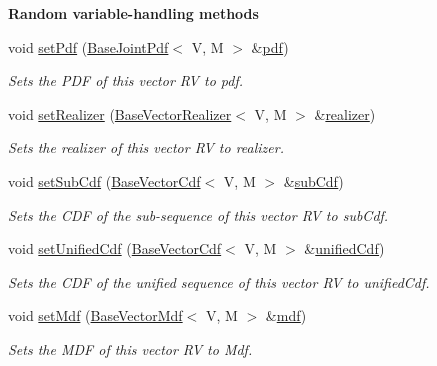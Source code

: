 \begin{Indent}{\bf Random variable-\/handling methods}\par
\begin{DoxyCompactItemize}
\item 
void \hyperlink{class_q_u_e_s_o_1_1_generic_vector_r_v_a1645a2db9e84b44df65faefda9921277}{set\-Pdf} (\hyperlink{class_q_u_e_s_o_1_1_base_joint_pdf}{Base\-Joint\-Pdf}$<$ V, M $>$ \&\hyperlink{class_q_u_e_s_o_1_1_base_vector_r_v_a3206740e05e0c64a88273029e963b185}{pdf})
\begin{DoxyCompactList}\small\item\em Sets the P\-D\-F of {\ttfamily this} vector R\-V to {\ttfamily pdf}. \end{DoxyCompactList}\item 
void \hyperlink{class_q_u_e_s_o_1_1_generic_vector_r_v_a79509d97d93176da2113930c7225b0fd}{set\-Realizer} (\hyperlink{class_q_u_e_s_o_1_1_base_vector_realizer}{Base\-Vector\-Realizer}$<$ V, M $>$ \&\hyperlink{class_q_u_e_s_o_1_1_base_vector_r_v_aea4b01eef0baf36944d14459a7b9ccf4}{realizer})
\begin{DoxyCompactList}\small\item\em Sets the realizer of {\ttfamily this} vector R\-V to {\ttfamily realizer}. \end{DoxyCompactList}\item 
void \hyperlink{class_q_u_e_s_o_1_1_generic_vector_r_v_ab4d13e93cf8b2bf9d61c6fcf6306858e}{set\-Sub\-Cdf} (\hyperlink{class_q_u_e_s_o_1_1_base_vector_cdf}{Base\-Vector\-Cdf}$<$ V, M $>$ \&\hyperlink{class_q_u_e_s_o_1_1_base_vector_r_v_a905586dc1529a3ae7dd7f04313ca9e8a}{sub\-Cdf})
\begin{DoxyCompactList}\small\item\em Sets the C\-D\-F of the sub-\/sequence of {\ttfamily this} vector R\-V to {\ttfamily sub\-Cdf}. \end{DoxyCompactList}\item 
void \hyperlink{class_q_u_e_s_o_1_1_generic_vector_r_v_aa92eb9b8bff6cf9d82e32c98b4b7b0c9}{set\-Unified\-Cdf} (\hyperlink{class_q_u_e_s_o_1_1_base_vector_cdf}{Base\-Vector\-Cdf}$<$ V, M $>$ \&\hyperlink{class_q_u_e_s_o_1_1_base_vector_r_v_a045a14e1ee948ac3162199a06606ce80}{unified\-Cdf})
\begin{DoxyCompactList}\small\item\em Sets the C\-D\-F of the unified sequence of {\ttfamily this} vector R\-V to {\ttfamily unified\-Cdf}. \end{DoxyCompactList}\item 
void \hyperlink{class_q_u_e_s_o_1_1_generic_vector_r_v_a26904c9c8cff4f901e28c067e4b71110}{set\-Mdf} (\hyperlink{class_q_u_e_s_o_1_1_base_vector_mdf}{Base\-Vector\-Mdf}$<$ V, M $>$ \&\hyperlink{class_q_u_e_s_o_1_1_base_vector_r_v_a81f6ade1c28022b813d1276f2c217404}{mdf})
\begin{DoxyCompactList}\small\item\em Sets the M\-D\-F of {\ttfamily this} vector R\-V to {\ttfamily Mdf}. \end{DoxyCompactList}\end{DoxyCompactItemize}
\end{Indent}
